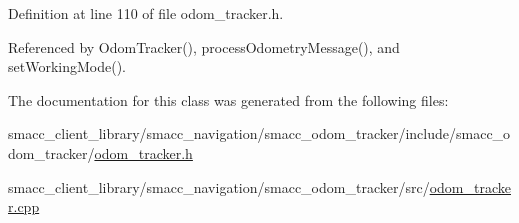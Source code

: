 Definition at line 110 of file odom\+\_\+tracker.\+h.



Referenced by Odom\+Tracker(), process\+Odometry\+Message(), and set\+Working\+Mode().



The documentation for this class was generated from the following files\+:\begin{DoxyCompactItemize}
\item 
smacc\+\_\+client\+\_\+library/smacc\+\_\+navigation/smacc\+\_\+odom\+\_\+tracker/include/smacc\+\_\+odom\+\_\+tracker/\hyperlink{odom__tracker_8h}{odom\+\_\+tracker.\+h}\item 
smacc\+\_\+client\+\_\+library/smacc\+\_\+navigation/smacc\+\_\+odom\+\_\+tracker/src/\hyperlink{odom__tracker_8cpp}{odom\+\_\+tracker.\+cpp}\end{DoxyCompactItemize}
